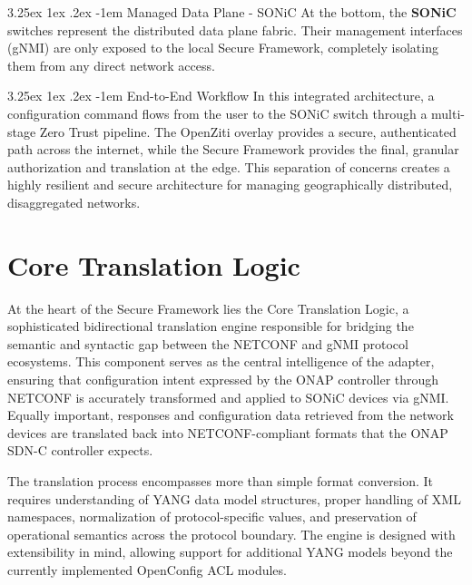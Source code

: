 \documentclass[12pt, a4paper, reqno, oneside]{book}
\makeatletter
\renewcommand\paragraph{\@startsection{paragraph}{5}{\z@}%
  {3.25ex \@plus1ex \@minus.2ex}%
  {-1em}%
  {\normalfont\normalsize\bfseries}}
\makeatother
\begin{document}
\paragraph{Managed Data Plane - SONiC}
At the bottom, the \textbf{SONiC} switches represent the distributed data plane fabric. Their management interfaces (gNMI) are only exposed to the local Secure Framework, completely isolating them from any direct network access.

\paragraph{End-to-End Workflow}
In this integrated architecture, a configuration command flows from the user to the SONiC switch through a multi-stage Zero Trust pipeline. The OpenZiti overlay provides a secure, authenticated path across the internet, while the Secure Framework provides the final, granular authorization and translation at the edge. This separation of concerns creates a highly resilient and secure architecture for managing geographically distributed, disaggregated networks.

\section{Core Translation Logic}

\label{sec:translation_logic}

At the heart of the Secure Framework lies the Core Translation Logic, a sophisticated bidirectional translation engine responsible for bridging the semantic and syntactic gap between the NETCONF and gNMI protocol ecosystems. This component serves as the central intelligence of the adapter, ensuring that configuration intent expressed by the ONAP controller through NETCONF is accurately transformed and applied to SONiC devices via gNMI. Equally important, responses and configuration data retrieved from the network devices are translated back into NETCONF-compliant formats that the ONAP SDN-C controller expects.

The translation process encompasses more than simple format conversion. It requires understanding of YANG data model structures, proper handling of XML namespaces, normalization of protocol-specific values, and preservation of operational semantics across the protocol boundary. The engine is designed with extensibility in mind, allowing support for additional YANG models beyond the currently implemented OpenConfig ACL modules.
\end{document}

